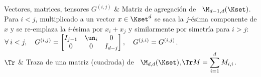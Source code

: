 \begin{notation}{Vectores, matrices, tensores}
%
$G^{(i,j)}$ & Matriz de agregaci\'on de \ $\M_{d-1,d}(\Kset)$. Para $i < j$,
multiplicado a un vector $x \in \Kset^d$ se saca la $j$-\'esima componente de
$x$ y se re-emplaza la $i$-\'esima por $x_i + x_j$ y similarmente por simetr\'ia
para $i > j$:\vspace{1mm}\newline $\forall \: i < j, \quad G^{(i,j)} =
\protect\begin{bmatrix} I_{j-1} & \un_i & 0\\ 0 & 0 &
I_{d-j} \end{bmatrix}\protect, \quad G^{(j,i)} =
G^{(i,j)}$.\vspace{1mm}\\[2.5mm]
\hline
%
$\Tr$ & Traza de una matriz (cuadrada) de \
$\M_{d,d}(\Kset)$,\vspace{1mm}\newline $\displaystyle \Tr M = \sum_{i=1}^d
M_{i,i}$.\vspace{1mm}\\[2.5mm]

\end{notation}
